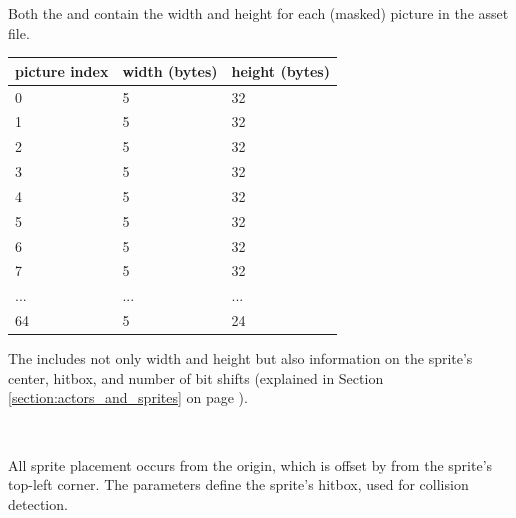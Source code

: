 \documentclass[book.tex]{subfiles}
\begin{document}
\pagebreak
Both the  and  contain the width and height for each (masked) picture in the asset file.\\
  \begin{table}[H]
  \begin{tabularx}{0.8\textwidth}[c]{XXX}
  \hline
  \textbf{picture index} & \textbf{width (bytes)} & \textbf{height (bytes)}   \\ \hline
  0             & 5          & 32    \\
  1             & 5          & 32    \\
  2             & 5          & 32    \\
  3             & 5          & 32    \\
  4             & 5          & 32    \\
  5             & 5          & 32    \\
  6             & 5          & 32    \\
  7             & 5          & 32    \\
  ...             & ...          & ...    \\
  64             & 5          & 24    \\
  \end{tabularx}
  \end{table}

\par
The  includes not only width and height but also information on the sprite's center, hitbox, and number of bit shifts (explained in Section \ref{section:actors_and_sprites} on page \pageref{section:actors_and_sprites}). \\

\par
\begin{minipage}{\textwidth}
 \par
 \end{minipage}\\


\par
All sprite placement occurs from the origin, which is offset by  from the sprite's top-left corner. The parameters  define the sprite's hitbox, used for collision detection.\\
\end{document}
